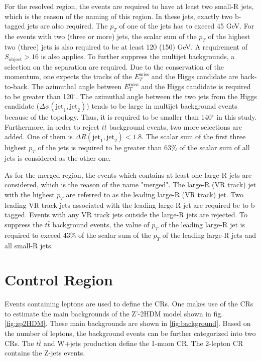 \documentclass[class=NCU_thesis, crop=false]{standalone}
\begin{document}
	For the resolved region, the events are required to have at least two small-R jets, which is the reason of the naming of this region. In these jets, exactly two b-tagged jets are also required. The $p_T$ of one of the jets has to exceed 45 GeV. For the events with two (three or more) jets, the scalar sum of the $p_T$ of the highest two (three) jets is also required to be at least 120 (150) GeV. A requirement of $S_{\mathrm{object}} > 16$ is also applies. To further suppress the multijet backgrounds, a selection on the separation are required. Due to the conservation of the momentum, one expects the tracks of the $E_T^{\mathrm{miss}}$ and the Higgs candidate are back-to-back. The azimuthal angle between $E_T^{\mathrm{miss}}$ and the Higgs candidate is required to be greater than 120$^\circ$. The azimuthal angle between the two jets from the Higgs candidate ($\Delta \phi(\mathrm{jet}_1, \mathrm{jet}_2)$) tends to be large in multijet background events because of the topology. Thus, it is required to be smaller than 140$^\circ$ in this study. Furthermore, in order to reject $t\bar{t}$ background events, two more selections are added. One of them is $\Delta R(\mathrm{jet}_1, \mathrm{jet}_2) < 1.8$. The scalar sum of the first three highest $p_T$ of the jets is required to be greater than 63\% of the scalar sum of all jets is considered as the other one.
	
	As for the merged region, the events which contains at least one large-R jets are considered, which is the reason of the name "merged". The large-R (VR track) jet with the highest $p_T$ are referred to as the leading large-R (VR track) jet. Two leading VR track jets associated with the leading large-R jet are required be to b-tagged. Events with any VR track jets outside the large-R jets are rejected. To suppress the $t\bar{t}$ background events, the value of $p_T$ of the leading large-R jet is required to exceed 43\% of the scalar sum of the $p_T$ of the leading large-R jets and all small-R jets.
	
\section{Control Region}
	Events containing leptons are used to define the CRs. One makes use of the CRs to estimate the main backgrounds of the Z'-2HDM model shown in fig. \ref{fig:zp2HDM}. These main backgrounds are shown in \ref{fig:background}. Based on the number of leptons, the background events can be further categorized into two CRs. The $t\bar{t}$ and W+jets production define the 1-muon CR. The 2-lepton CR contains the Z-jets events.
	
\end{document}
